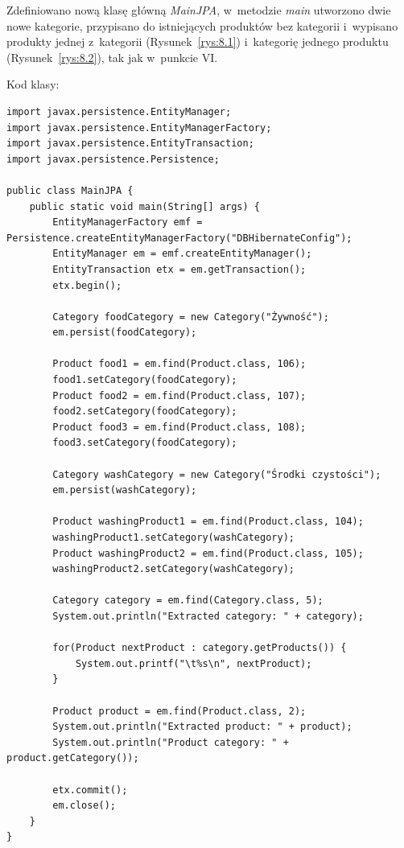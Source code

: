 \documentclass[12pt, a4paper]{mwart}
\begin{document}
Zdefiniowano nową klasę główną \textit{MainJPA}, w~metodzie \textit{main} utworzono dwie nowe kategorie, przypisano do istniejących produktów bez kategorii i~wypisano produkty jednej z~kategorii (Rysunek~\ref{rys:8.1}) i~kategorię jednego produktu (Rysunek~\ref{rys:8.2}), tak jak w~punkcie VI. 

Kod klasy:
\begin{lstlisting}
import javax.persistence.EntityManager;
import javax.persistence.EntityManagerFactory;
import javax.persistence.EntityTransaction;
import javax.persistence.Persistence;

public class MainJPA {
    public static void main(String[] args) {
        EntityManagerFactory emf = Persistence.createEntityManagerFactory("DBHibernateConfig");
        EntityManager em = emf.createEntityManager();
        EntityTransaction etx = em.getTransaction();
        etx.begin();

        Category foodCategory = new Category("Żywność");
        em.persist(foodCategory);

        Product food1 = em.find(Product.class, 106);
        food1.setCategory(foodCategory);
        Product food2 = em.find(Product.class, 107);
        food2.setCategory(foodCategory);
        Product food3 = em.find(Product.class, 108);
        food3.setCategory(foodCategory);

        Category washCategory = new Category("Środki czystości");
        em.persist(washCategory);

        Product washingProduct1 = em.find(Product.class, 104);
        washingProduct1.setCategory(washCategory);
        Product washingProduct2 = em.find(Product.class, 105);
        washingProduct2.setCategory(washCategory);

        Category category = em.find(Category.class, 5);
        System.out.println("Extracted category: " + category);

        for(Product nextProduct : category.getProducts()) {
            System.out.printf("\t%s\n", nextProduct);
        }

        Product product = em.find(Product.class, 2);
        System.out.println("Extracted product: " + product);
        System.out.println("Product category: " + product.getCategory());

        etx.commit();
        em.close();
    }
}
\end{lstlisting}
\end{document}
